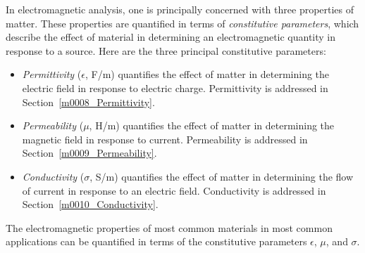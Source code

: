 

\label{m0007_Properties_of_Materials} %

In electromagnetic analysis, one is principally concerned with three properties of matter.
These properties are quantified in terms of \emph{constitutive parameters}, 
which describe the effect of material in determining an electromagnetic quantity in response to a source.  
Here are the three principal constitutive parameters:
%
\begin{itemize}
\item \emph{Permittivity} 
($\epsilon$, F/m) quantifies the effect of matter in determining the electric field in response to electric charge.  
Permittivity is addressed in Section~\ref{m0008_Permittivity}.
\item \emph{Permeability} 
($\mu$, H/m) quantifies the effect of matter in determining the magnetic field in response to current.  
Permeability is addressed in Section~\ref{m0009_Permeability}.
\item \emph{Conductivity} 
($\sigma$, S/m) quantifies the effect of matter in determining the flow of current in response to an electric field.  
Conductivity is addressed in Section~\ref{m0010_Conductivity}.
\end{itemize} 

\begin{mdframed}[backgroundcolor=yellow!20,nobreak=true] 
The electromagnetic properties of most common materials in most common applications can be quantified in terms of the constitutive parameters $\epsilon$, $\mu$, and $\sigma$. 
\end{mdframed}

